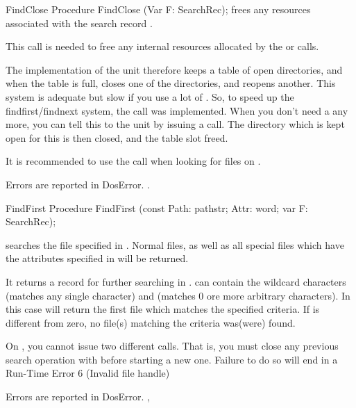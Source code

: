 \begin{procedure}{FindClose}
\Declaration
Procedure FindClose (Var F: SearchRec);
\Description
{} frees any resources associated with the search record
.

This call is needed to free any internal resources allocated by the 
 or  calls.


The \linux implementation of the \dos unit therefore keeps a table of open
directories, and when the table is full, closes one of the directories, and
reopens another. This system is adequate but slow if you use a lot of
.
So, to speed up the findfirst/findnext system, the  call was
implemented. When you don't need a  any more, you can tell
this to the \dos unit by issuing a  call. The directory
which is kept open for this  is then closed, and the table slot
freed.

\Portability
It is recommended to use the \linux call  when looking for files 
on \linux.

\Errors
Errors are reported in DosError.
\SeeAlso
{}.
\end{procedure}

\begin{procedure}{FindFirst}
\Declaration
Procedure FindFirst (const Path: pathstr; Attr: word; var F: SearchRec);
\Description

 searches the file specified in . Normal files,
as well as all special files which have the attributes specified in
 will be returned.

It returns a  record for further searching in .
 can contain the wildcard characters  (matches any single
character) and \var{*} (matches 0 ore more arbitrary characters). In this
case  will return the first file which matches the specified
criteria.
If  is different from zero, no file(s) matching the criteria 
was(were) found.

\Portability
On \ostwo, you cannot issue two different  calls. That is,
you must close any previous search operation with  before
starting a new one. Failure to do so will end in a Run-Time Error 6 
(Invalid file handle)

\Errors
Errors are reported in DosError.
\SeeAlso
{},
\end{procedure}

